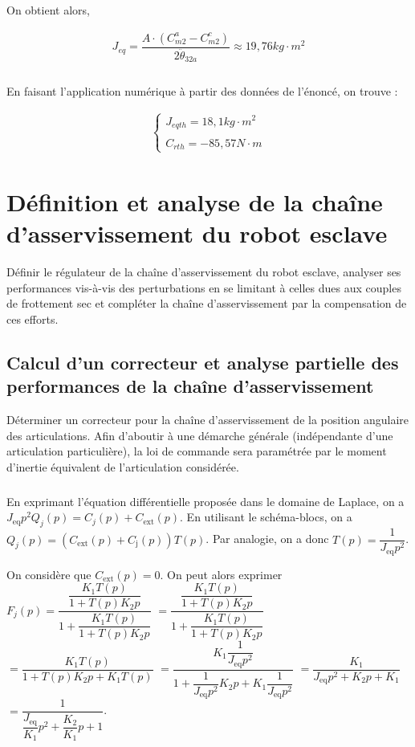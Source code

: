 \documentclass[10pt,fleqn]{article} %
\begin{document}
On obtient alors,

\begin{align*}
J_{eq}=\dfrac{A\cdot \left(C^{a}_{m2}-C^{c}_{m2}\right)}{2\ddot{\theta}_{32a}} \approx 19,76 kg\cdot m^2
\end{align*}


\subparagraph{}%

En faisant l'application numérique à partir des données de l'énoncé, on trouve : 

\begin{align*}
\left\{
\begin{array}{c}
J_{eqth}=18,1kg\cdot m^2\\
\\
C_{rth}=-85,57N\cdot m
\end{array}
\right.
\end{align*}

\section{Définition et analyse de la chaîne d’asservissement du robot esclave}
\begin{obj}
Définir le régulateur de la chaîne d’asservissement du robot esclave, analyser ses performances vis-à-vis
des perturbations en se limitant à celles dues aux couples de frottement sec et compléter la chaîne
d’asservissement par la compensation de ces efforts.
\end{obj}

\subsection{Calcul d’un correcteur et analyse partielle des performances de la chaîne d’asservissement}
\begin{obj}
Déterminer un correcteur pour la chaîne d’asservissement de la position angulaire des articulations.
Afin d’aboutir à une démarche générale (indépendante d’une articulation particulière), la loi de commande
sera paramétrée par le moment d’inertie équivalent de l’articulation considérée.
\end{obj}

\subparagraph{}%
En exprimant l'équation différentielle proposée dans le domaine de Laplace, on a 
$J_{\text{eq}} p^2{Q}_j(p)=C_j(p)+C_{\text{ext}}(p)$.
En utilisant le schéma-blocs, on a $Q_j(p)=\left(C_{\text{ext}}(p)+C_{\text{j}}(p)\right)T(p)$. 
Par analogie, on a donc $T(p)=\dfrac{1}{J_{\text{eq}}p^2}$.

On considère que $C_{\text{ext}}(p)=0$.  On peut alors exprimer 
$F_j(p)= \dfrac{\dfrac{K_1T(p)}{1+T(p)K_2 p} }{1+\dfrac{K_1T(p)}{1+T(p)K_2 p}}$
$= \dfrac{\dfrac{K_1T(p)}{1+T(p)K_2 p} }{1+\dfrac{K_1T(p)}{1+T(p)K_2 p}}$
$= \dfrac{K_1T(p) }{1+T(p)K_2 p+K_1T(p)}$
$= \dfrac{K_1\dfrac{1}{J_{\text{eq}}p^2}}{1+\dfrac{1}{J_{\text{eq}}p^2}K_2 p+K_1\dfrac{1}{J_{\text{eq}}p^2}}$
$= \dfrac{K_1}{J_{\text{eq}}p^2+K_2 p+K_1}$
$= \dfrac{1}{\dfrac{J_{\text{eq}}}{K_1}p^2+\dfrac{K_2}{K_1}p+1}$.
\end{document}
